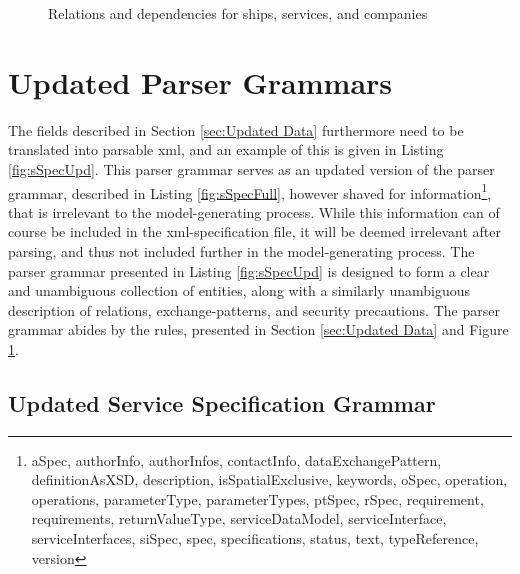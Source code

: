 \begin{figure}
	\caption{Relations and dependencies for ships, services, and companies}
	\label{fig:entities}
\end{figure}


\section{Updated Parser Grammars}

The fields described in Section \ref{sec:Updated Data} furthermore need to be translated into parsable xml, and an example of this is given in Listing \ref{fig:sSpecUpd}. This parser grammar serves as an updated version of the parser grammar, described in Listing \ref{fig:sSpecFull}, however shaved for information\footnote{aSpec, authorInfo, authorInfos, contactInfo, dataExchangePattern, definitionAsXSD, description, isSpatialExclusive, keywords, oSpec, operation, operations, parameterType, parameterTypes, ptSpec, rSpec, requirement, requirements, returnValueType, serviceDataModel, serviceInterface, serviceInterfaces, siSpec, spec, specifications, status, text, typeReference, version}, that is irrelevant to the model-generating process. While this information can of course be included in the xml-specification file, it will be deemed irrelevant after parsing, and thus not included further in the model-generating process. The parser grammar presented in Listing \ref{fig:sSpecUpd} is designed to form a clear and unambiguous collection of entities, along with a similarly unambiguous description of relations, exchange-patterns, and security precautions. The parser grammar abides by the rules, presented in Section \ref{sec:Updated Data} and Figure \ref{fig:entities}.

\subsection{Updated Service Specification Grammar}

